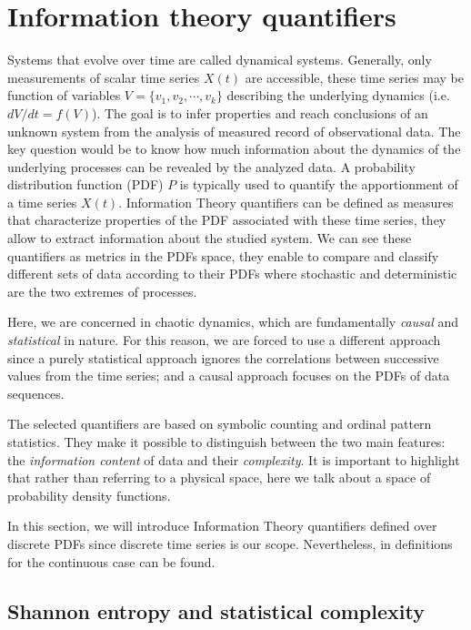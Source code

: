 \section{Information theory quantifiers}\label{sec:quanti}

Systems that evolve over time are called dynamical systems.
Generally, only measurements of scalar time series $X(t)$ are accessible, these time series may be function of variables $V=\{ v_1, v_2,\cdots, v_k\}$ describing the underlying dynamics (i.e. $dV/dt=f(V)$).
The goal is to infer properties and reach conclusions of an unknown system from the analysis of measured record of observational data.
The key question would be to know how much information about the dynamics of the underlying processes can be revealed by the analyzed data.
A probability distribution function (PDF) $P$ is typically used to quantify the apportionment of a time series $X(t)$.
Information Theory quantifiers can be defined as measures that characterize properties of the PDF associated with these time series, they allow to extract information about the studied system.
We can see these quantifiers as metrics in the PDFs space, they enable to compare and classify different sets of data according to their PDFs where stochastic and deterministic are the two extremes of processes.

Here, we are concerned in chaotic dynamics, which are fundamentally \textit{causal} and \textit{statistical} in nature.
For this reason, we are forced to use a different approach since a purely statistical approach ignores the correlations between successive values from the time series; and a causal approach focuses on the PDFs of data sequences.

The selected quantifiers are based on symbolic counting and ordinal pattern statistics.
They make it possible to distinguish between the two main features: the \textit{information content} of data and their \textit{complexity}.
It is important to highlight that rather than referring to a physical space, here we talk about a space of probability density functions.

In this section, we will introduce Information Theory quantifiers defined over discrete PDFs since discrete time series is our scope.
Nevertheless, in \cite{Shannon1948} definitions for the continuous case can be found. 

\subsection{Shannon entropy and statistical complexity}


